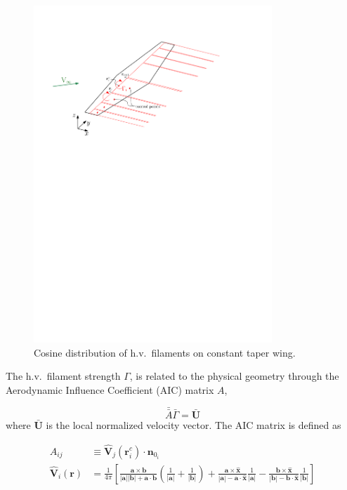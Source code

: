 \documentclass[10pt, a4paper]{article}
\begin{document}
\begin{figure}[h!]
	\begin{center}
	\includegraphics[width=0.8\textwidth]{wvl.pdf}
    \caption{Cosine distribution of h.v.\ filaments on constant taper wing.}
	\label{f:wvl}
	\end{center}
\end{figure}

The h.v.\ filament strength $\Gamma$, is related to the physical geometry through the Aerodynamic Influence Coefficient (AIC) matrix $A$, 

\begin{equation}
    \bar{\bar{A}} \bar{\Gamma} = \bar{\mathbf{U}}
\end{equation}
where $\bar{\mathbf{U}}$ is the local normalized velocity vector. The AIC matrix is defined as 

\begin{align}
    A_{ij} &\equiv \hat{\mathbf{V}}_j (\mathbf{r}_i^c) \cdot \bm{n}_{0_i} \\
    \hat{\mathbf{V}}_i (\mathbf{r}) &= \frac{1}{4\pi} \left[ \frac{\mathbf{a} \times \mathbf{b}}{|\mathbf{a}| |\mathbf{b}| + \mathbf{a} \cdot \mathbf{b}} \left( \frac{1}{|\mathbf{a}|} + \frac{1}{|\mathbf{b}|}\right) + \frac{\mathbf{a} \times \hat{\mathbf{x}}}{|\mathbf{a}| - \mathbf{a} \cdot \hat{\mathbf{x}}} \frac{1}{|\mathbf{a}|} - \frac{\mathbf{b} \times \hat{\mathbf{x}}}{|\mathbf{b}| - \mathbf{b} \cdot \hat{\mathbf{x}}} \frac{1}{|\mathbf{b}|} \right]
\end{align}
\end{document}
